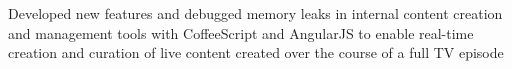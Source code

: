 \begin{job}

  \begin{extendedaccomplishments}
    \item Developed new features and debugged memory leaks in internal content
    creation and management tools with CoffeeScript and AngularJS to enable
    real-time creation and curation of live content created over the course of a
    full TV episode
  \end{extendedaccomplishments}
\end{job}
